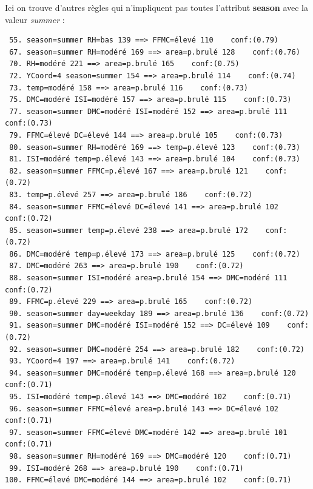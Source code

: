 \documentclass{article}
\begin{document}
\begin{sffamily}
Ici on trouve d'autres règles qui n'impliquent pas toutes l'attribut \textbf{season} avec la valeur \textit{summer} :
\begin{center}
	\begin{verbatim}
 55. season=summer RH=bas 139 ==> FFMC=élevé 110    conf:(0.79)
 67. season=summer RH=modéré 169 ==> area=p.brulé 128    conf:(0.76)
 70. RH=modéré 221 ==> area=p.brulé 165    conf:(0.75)
 72. YCoord=4 season=summer 154 ==> area=p.brulé 114    conf:(0.74)
 73. temp=modéré 158 ==> area=p.brulé 116    conf:(0.73)
 75. DMC=modéré ISI=modéré 157 ==> area=p.brulé 115    conf:(0.73)
 77. season=summer DMC=modéré ISI=modéré 152 ==> area=p.brulé 111    conf:(0.73)
 79. FFMC=élevé DC=élevé 144 ==> area=p.brulé 105    conf:(0.73)
 80. season=summer RH=modéré 169 ==> temp=p.élevé 123    conf:(0.73)
 81. ISI=modéré temp=p.élevé 143 ==> area=p.brulé 104    conf:(0.73)
 82. season=summer FFMC=p.élevé 167 ==> area=p.brulé 121    conf:(0.72)
 83. temp=p.élevé 257 ==> area=p.brulé 186    conf:(0.72)
 84. season=summer FFMC=élevé DC=élevé 141 ==> area=p.brulé 102    conf:(0.72)
 85. season=summer temp=p.élevé 238 ==> area=p.brulé 172    conf:(0.72)
 86. DMC=modéré temp=p.élevé 173 ==> area=p.brulé 125    conf:(0.72)
 87. DMC=modéré 263 ==> area=p.brulé 190    conf:(0.72)
 88. season=summer ISI=modéré area=p.brulé 154 ==> DMC=modéré 111    conf:(0.72)
 89. FFMC=p.élevé 229 ==> area=p.brulé 165    conf:(0.72)
 90. season=summer day=weekday 189 ==> area=p.brulé 136    conf:(0.72)
 91. season=summer DMC=modéré ISI=modéré 152 ==> DC=élevé 109    conf:(0.72)
 92. season=summer DMC=modéré 254 ==> area=p.brulé 182    conf:(0.72)
 93. YCoord=4 197 ==> area=p.brulé 141    conf:(0.72)
 94. season=summer DMC=modéré temp=p.élevé 168 ==> area=p.brulé 120    conf:(0.71)
 95. ISI=modéré temp=p.élevé 143 ==> DMC=modéré 102    conf:(0.71)
 96. season=summer FFMC=élevé area=p.brulé 143 ==> DC=élevé 102    conf:(0.71)
 97. season=summer FFMC=élevé DMC=modéré 142 ==> area=p.brulé 101    conf:(0.71)
 98. season=summer RH=modéré 169 ==> DMC=modéré 120    conf:(0.71)
 99. ISI=modéré 268 ==> area=p.brulé 190    conf:(0.71)
100. FFMC=élevé DMC=modéré 144 ==> area=p.brulé 102    conf:(0.71)
	\end{verbatim}
\end{center}


\end{sffamily}
\end{document}
